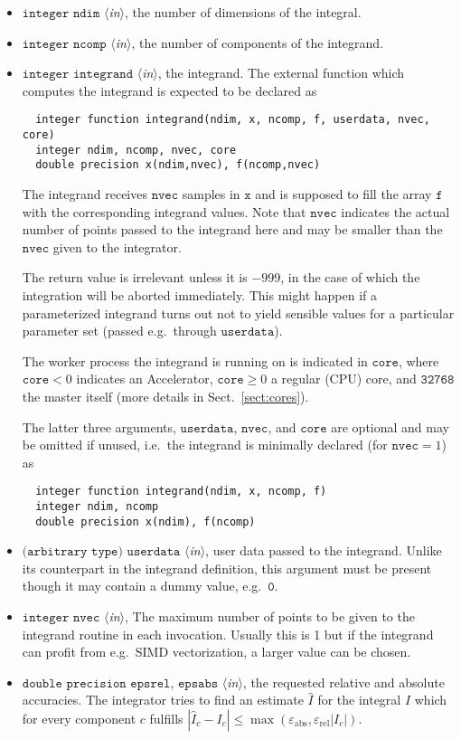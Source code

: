 \documentclass[12pt]{article}
\newcommand\ie{i.e.\ }
\newcommand\eg{e.g.\ }
\newcommand\epsabs{\varepsilon_{\text{abs}}}
\newcommand\epsrel{\varepsilon_{\text{rel}}}
\newcommand\Code[1]{\ensuremath{\texttt{#1}}}
\newcommand\VarIn[1]{\item\Code{#1} \textit{$\langle$in\/$\rangle$},}
\begin{document}
\begin{itemize}
\VarIn{integer ndim}
the number of dimensions of the integral.

\VarIn{integer ncomp}
the number of components of the integrand.

\VarIn{integer integrand}
the integrand.  The external function which computes the 
integrand is expected to be declared as
\begin{verbatim}
  integer function integrand(ndim, x, ncomp, f, userdata, nvec, core)
  integer ndim, ncomp, nvec, core
  double precision x(ndim,nvec), f(ncomp,nvec)
\end{verbatim}
The integrand receives \Code{nvec} samples in \Code{x} and is supposed 
to fill the array \Code{f} with the corresponding integrand values.  
Note that \Code{nvec} indicates the actual number of points passed to 
the integrand here and may be smaller than the \Code{nvec} given to the 
integrator.

The return value is irrelevant unless it is $-999$, in the case of which 
the integration will be aborted immediately.  This might happen if a 
parameterized integrand turns out not to yield sensible values for a 
particular parameter set (passed \eg through \Code{userdata}).

The worker process the integrand is running on is indicated in 
\Code{core}, where $\Code{core} < 0$ indicates an Accelerator, 
$\Code{core}\geqslant 0$ a regular (CPU) core, and \Code{32768} the 
master itself (more details in Sect.~\ref{sect:cores}).

The latter three arguments, \Code{userdata}, \Code{nvec}, and 
\Code{core} are optional and may be omitted if unused, \ie the integrand 
is minimally declared (for $\Code{nvec} = 1$) as
\begin{verbatim}
  integer function integrand(ndim, x, ncomp, f)
  integer ndim, ncomp
  double precision x(ndim), f(ncomp)
\end{verbatim}

\VarIn{(arbitrary type) userdata}
user data passed to the integrand.  Unlike its counterpart in the
integrand definition, this argument must be present though it may
contain a dummy value, \eg \Code{0}.

\VarIn{integer nvec}
The maximum number of points to be given to the integrand
routine in each invocation.  Usually this is 1 but if the integrand
can profit from \eg SIMD vectorization, a larger value can be chosen.

\VarIn{double precision epsrel, epsabs}
the requested relative and absolute accuracies.
The integrator tries to find an estimate $\hat I$ for the integral $I$
which for every component $c$ fulfills $|\hat I_c - I_c|\leqslant
\max(\epsabs, \epsrel |I_c|)$.


\end{itemize}
\end{document}
